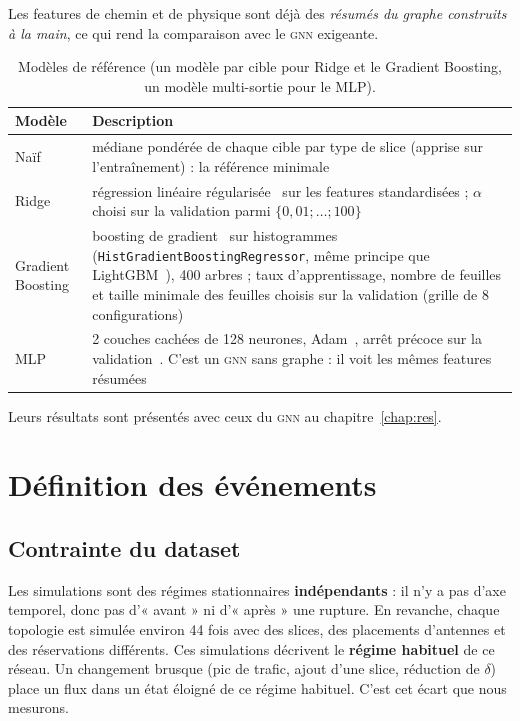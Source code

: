 \documentclass[11pt,a4paper]{report}
\newcommand{\gnn}{\textsc{gnn}}
\begin{document}
Les features de chemin et de physique sont déjà des \emph{résumés du graphe construits à la main}, ce qui rend la comparaison avec le \gnn{} exigeante.

\begin{table}[H]
\centering\small
\begin{tabularx}{\linewidth}{@{}lX@{}}
\toprule
Modèle & Description\\
\midrule
Naïf & médiane pondérée de chaque cible par type de slice (apprise sur l'entraînement) : la référence minimale\\
Ridge & régression linéaire régularisée~\cite{ridge} sur les features standardisées ; $\alpha$ choisi sur la validation parmi $\{0{,}01;\dots;100\}$\\
Gradient Boosting & boosting de gradient~\cite{friedman} sur histogrammes (\texttt{HistGradientBoostingRegressor}, même principe que LightGBM~\cite{lightgbm}), 400 arbres ; taux d'apprentissage, nombre de feuilles et taille minimale des feuilles choisis sur la validation (grille de 8 configurations)\\
MLP & 2 couches cachées de 128 neurones, Adam~\cite{adam}, arrêt précoce sur la validation~\cite{prechelt}. C'est un \gnn{} sans graphe : il voit les mêmes features résumées\\
\bottomrule
\end{tabularx}
\caption{Modèles de référence (un modèle par cible pour Ridge et le Gradient Boosting, un modèle multi-sortie pour le MLP).}
\end{table}

Leurs résultats sont présentés avec ceux du \gnn{} au chapitre~\ref{chap:res}.

\chapter{Définition des événements}\label{chap:evt}
\section{Contrainte du dataset}
Les simulations sont des régimes stationnaires \textbf{indépendants} : il n'y a pas d'axe temporel, donc pas d'« avant » ni d'« après » une rupture. En revanche, chaque topologie est simulée environ 44 fois avec des slices, des placements d'antennes et des réservations différents. Ces simulations décrivent le \textbf{régime habituel} de ce réseau. Un changement brusque (pic de trafic, ajout d'une slice, réduction de $\delta$) place un flux dans un état éloigné de ce régime habituel. C'est cet écart que nous mesurons.
\end{document}
